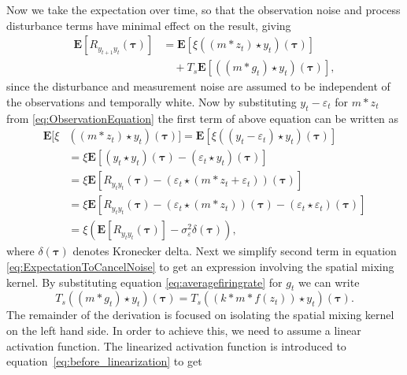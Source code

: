 \documentclass[10pt,twocolumn,twoside]{IEEEtran}
\begin{document}
Now we take the expectation over time, so that the observation noise and process disturbance terms have minimal effect on the result, giving 
\begin{align}\label{eq:ExpectationToCancelNoise}
	\mathbf{E}[R_{y_{t+1}y_t}(\boldsymbol{\tau})] &= \mathbf{E}[\xi\left(\left(m \ast z_t\right) \star y_t \right)(\boldsymbol{\tau})] \nonumber \\
	 &\quad+ T_s \mathbf{E}[\left(\left(m\ast g_t\right)\star y_t \right)(\boldsymbol{\tau})],
\end{align}
since the disturbance and measurement noise are assumed to be independent of the observations and temporally white. Now by substituting $y_t - \varepsilon_t$ for $m\ast z_t$ from \eqref{eq:ObservationEquation} the first term of above equation can be written as
\begin{align}
	\mathbf{E}[\xi&\left(\left(m \ast z_t \right) \star y_t \right)(\boldsymbol{\tau})] = \mathbf{E}\left[\xi\left(\left(y_t-\varepsilon_t\right) \star y_t \right)(\boldsymbol{\tau})\right] \nonumber \\
	&= \xi \mathbf{E}\left[ (y_t \star y_t)(\boldsymbol{\tau}) - \left(\varepsilon_t\star y_t \right)(\boldsymbol{\tau})\right] \nonumber \\
	&= \xi\mathbf{E}[ R_{y_ty_t}(\boldsymbol{\tau})  - \left(\varepsilon_t \star (m\ast z_t + \varepsilon_t)\right) (\boldsymbol{\tau})] \nonumber \\
	&=\xi\mathbf{E}[ R_{y_ty_t}(\boldsymbol{\tau}) -\left(\varepsilon_t\star (m\ast z_t)\right)(\boldsymbol{\tau}) - (\varepsilon_t\star\varepsilon_t)(\boldsymbol{\tau})] \nonumber\\ 
	&= \xi\left(\mathbf{E}[ R_{y_ty_t}(\boldsymbol{\tau})] - \sigma_{\varepsilon}^2 \delta(\boldsymbol{\tau})\right), \label{eq:FirstTermReduced}
\end{align}
where $\delta(\boldsymbol\tau)$ denotes Kronecker delta. Next we simplify second term in equation \eqref{eq:ExpectationToCancelNoise} to get an expression involving the spatial mixing kernel. By substituting equation \eqref{eq:averagefiringrate} for $g_t$ we can write
\begin{equation}\label{eq:before_linearization}
	T_s((m \ast g_t) \star y_t)(\boldsymbol\tau) = T_s((k \ast m\ast f(z_t)) \star y_t)(\boldsymbol\tau).
\end{equation}   
The remainder of the derivation is focused on isolating the spatial mixing kernel on the left hand side. In order to achieve this, we need to assume a linear activation function. The linearized activation function is introduced to equation~\eqref{eq:before_linearization} to get
\end{document}
